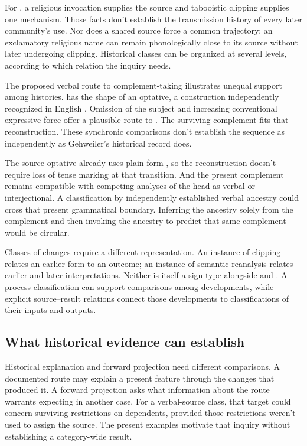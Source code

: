 \documentclass[12pt]{article}
\begin{document}
For , a religious invocation supplies the source and
tabooistic clipping supplies one mechanism. Those facts don't establish
the transmission history of every later community's use. Nor does a
shared source force a common trajectory: an exclamatory religious name
can remain phonologically close to its source without later undergoing
clipping. Historical classes can be organized at several
levels, according to which relation the inquiry needs.

The proposed verbal route to complement-taking  illustrates
unequal support among histories.  has the shape
of an optative, a construction independently recognized in English
\citep[944]{HuddlestonPullum2002}. Omission of the subject and increasing
conventional expressive force offer a plausible route to . The surviving complement fits that reconstruction. These synchronic
comparisons don't establish the sequence as independently as Gehweiler's
historical record does.

The source optative already uses plain-form , so the
reconstruction doesn't require loss of tense marking at that transition.
And the present complement remains compatible with competing analyses
of the head as verbal or interjectional. A classification by independently
established verbal ancestry could cross that present grammatical boundary.
Inferring the ancestry solely from the complement and then invoking
the ancestry to predict that same complement would be circular.

Classes of changes require a different representation. An instance of
clipping relates an earlier form to an outcome; an instance of semantic
reanalysis relates earlier and later interpretations. Neither is itself
a sign-type alongside  and . A process
classification can support comparisons among developments, while explicit
source--result relations connect those developments to classifications
of their inputs and outputs.

\subsection{What historical evidence can establish}

Historical explanation and forward projection need different comparisons.
A documented route may explain a present feature through the changes
that produced it. A forward projection asks what information about the
route warrants expecting in another case. For a verbal-source class,
that target could concern surviving restrictions on dependents, provided
those restrictions weren't used to assign the source. The present
examples motivate that inquiry without establishing a category-wide result.
\end{document}
